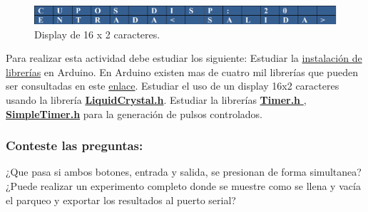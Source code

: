 \begin{figure}
	\centering
	\includegraphics[width=0.7\linewidth]{fig/Dislay.png}
	\caption{Display de 16 x 2 caracteres.}
	\label{fig:dislay}
\end{figure}

Para realizar esta actividad debe estudiar los siguiente:
 Estudiar la \href{https://docs.arduino.cc/software/ide-v1/tutorials/installing-libraries#.Uyd116h5PRk}{instalación de librerías} en Arduino. En Arduino existen mas de cuatro mil librerías que pueden ser consultadas en este \href{https://www.arduino.cc/reference/en/libraries/}{enlace}.
 Estudiar el uso de un display 16x2 caracteres usando la librería \href{http://arduino.cc/en/Tutorial/LiquidCrystalDisplay#.UyPQYfl5OSo }{\textbf{LiquidCrystal.h}}.
 Estudiar la librerías \href{https://github.com/sstaub/Timer}{\textbf{Timer.h }}, \href{https://github.com/kiryanenko/SimpleTimer}{\textbf{SimpleTimer.h}} para la generación de pulsos controlados.
 
\subsubsection{Conteste las preguntas:}

¿Que pasa si ambos botones, entrada y salida, se presionan de forma simultanea?
¿Puede realizar un experimento completo donde se muestre como se llena y vacía el parqueo y exportar los resultados al puerto serial?



